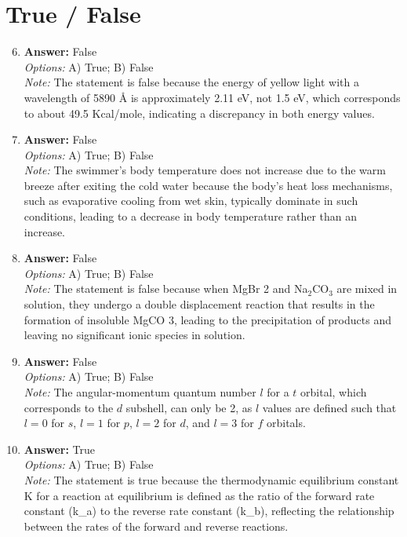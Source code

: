 \documentclass[12pt]{article}
\begin{document}
\section*{True / False}
\begin{enumerate}[label=\arabic*.]
\setcounter{enumi}{5}
\item \textbf{Answer:} False
\\ \textit{Options:} A) True; B) False
\\ \textit{Note:} The statement is false because the energy of yellow light with a wavelength of 5890 Å is approximately 2.11 eV, not 1.5 eV, which corresponds to about 49.5 Kcal/mole, indicating a discrepancy in both energy values.
\item \textbf{Answer:} False
\\ \textit{Options:} A) True; B) False
\\ \textit{Note:} The swimmer's body temperature does not increase due to the warm breeze after exiting the cold water because the body's heat loss mechanisms, such as evaporative cooling from wet skin, typically dominate in such conditions, leading to a decrease in body temperature rather than an increase.
\item \textbf{Answer:} False
\\ \textit{Options:} A) True; B) False
\\ \textit{Note:} The statement is false because when MgBr 2 and Na$_{2}$CO$_{3}$ are mixed in solution, they undergo a double displacement reaction that results in the formation of insoluble MgCO 3, leading to the precipitation of products and leaving no significant ionic species in solution.
\item \textbf{Answer:} False
\\ \textit{Options:} A) True; B) False
\\ \textit{Note:} The angular-momentum quantum number \( l \) for a \( t \) orbital, which corresponds to the \( d \) subshell, can only be 2, as \( l \) values are defined such that \( l = 0 \) for \( s \), \( l = 1 \) for \( p \), \( l = 2 \) for \( d \), and \( l = 3 \) for \( f \) orbitals.
\item \textbf{Answer:} True
\\ \textit{Options:} A) True; B) False
\\ \textit{Note:} The statement is true because the thermodynamic equilibrium constant K for a reaction at equilibrium is defined as the ratio of the forward rate constant (k\_a) to the reverse rate constant (k\_b), reflecting the relationship between the rates of the forward and reverse reactions.
\end{enumerate}
\end{document}
